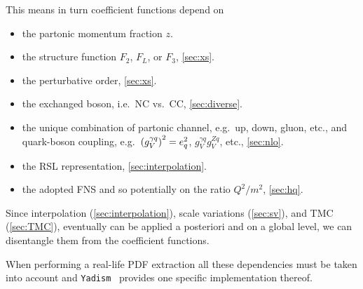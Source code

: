 This means in turn coefficient functions depend on
\begin{itemize}
    \item the partonic momentum fraction $z$.
    \item the structure function $F_2$, $F_L$, or $F_3$, \cref{sec:xs}.
    \item the perturbative order, \cref{sec:xs}.
    \item the exchanged boson, i.e.\ NC vs.\ CC, \cref{sec:diverse}.
    \item the unique combination of partonic channel, e.g.\ up, down, gluon, etc., and quark-boson coupling, e.g.\ $\qty(g_V^{\gamma q})^2=e_q^2$, $g_V^{\gamma q}g_V^{Z q}$, etc., \cref{sec:nlo}.
    \item the RSL representation, \cref{sec:interpolation}.
    \item the adopted FNS and so potentially on the ratio $Q^2/m^2$, \cref{sec:hq}.
\end{itemize}
Since interpolation (\cref{sec:interpolation}), scale variations (\cref{sec:sv}), and TMC (\cref{sec:TMC}), eventually can be applied a posteriori and on a global level, we can disentangle them from the coefficient functions.


When performing a real-life PDF extraction all these dependencies must be taken into account and \texttt{Yadism}~\cite{Candido:2024rkr,barontini_2026_18758473} provides one specific implementation thereof.

